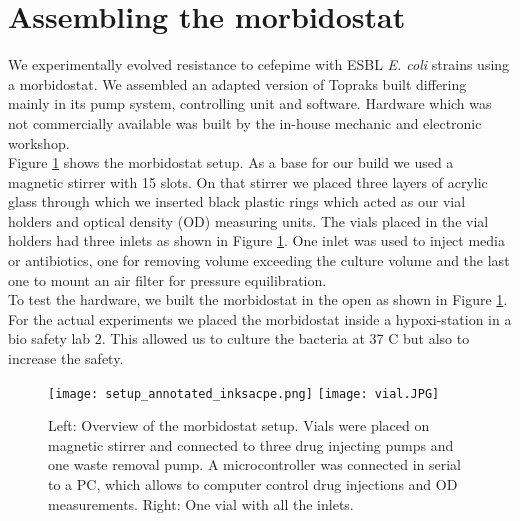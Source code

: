 \section{Assembling the morbidostat}
We experimentally evolved resistance to cefepime with ESBL \textit{E. coli} strains using a morbidostat. We assembled an adapted version of Topraks built differing mainly in its pump system, controlling unit and software\cite{toprak_building_2013}. Hardware which was not commercially available was built by the in-house mechanic and electronic workshop. \\
Figure \ref{figure:morbidostat_setup} shows the morbidostat setup.
As a base for our build we used a magnetic stirrer with 15 slots. On that stirrer we placed three layers of acrylic glass through which we inserted black plastic rings which acted as our vial holders and optical density (OD) measuring units. 
The vials placed in the vial holders had three inlets as shown in Figure \ref{figure:morbidostat_setup}. One inlet was used to inject media or antibiotics, one for removing volume exceeding the culture volume and the last one to mount an air filter for pressure equilibration. \\
To test the hardware, we built the morbidostat in the open as shown in Figure \ref{figure:morbidostat_setup}. For the actual experiments we placed the morbidostat inside a hypoxi-station in a bio safety lab 2. This allowed us to culture the bacteria at 37 \degree C but also to increase the safety. 

\begin{figure}
	\texttt{[image: setup\_annotated\_inksacpe.png]}
	\texttt{[image: vial.JPG]}
	\caption{Left: Overview of the morbidostat setup. Vials were placed on magnetic stirrer and connected to three drug injecting pumps and one waste removal pump. A microcontroller was connected in serial to a PC, which allows to computer control drug injections and OD measurements. Right: One vial with all the inlets.}
	\label{figure:morbidostat_setup}
\end{figure}  


